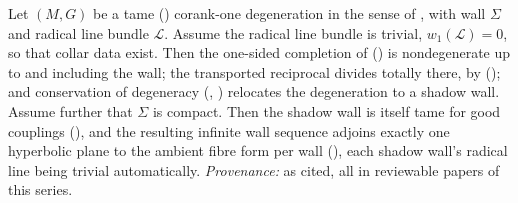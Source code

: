 Let $(M, G)$ be a tame () corank-one degeneration in the sense of \cite[Hyp.~2.1]{ButlerT4}, with wall $\Sigma$ and radical line bundle $\mathcal{L}$. Assume the radical line bundle is trivial, $w_1(\mathcal{L}) = 0$, so that collar data exist. Then the one-sided completion of \cite[Thm.~4.4]{ButlerT4} () is nondegenerate up to and including the wall; the transported reciprocal divides totally there, by \cite[Thm.~4.10]{ButlerT1} (); and conservation of degeneracy \cite[Thm.~5.1, Prop.~5.2]{ButlerT4} (, ) relocates the degeneration to a shadow wall. Assume further that $\Sigma$ is compact. Then the shadow wall is itself tame for good couplings \cite[Lem.~5.3]{ButlerT4} (), and the resulting infinite wall sequence adjoins exactly one hyperbolic plane to the ambient fibre form per wall \cite[Rem.~5.4, Cor.~5.5]{ButlerT4} (), each shadow wall's radical line being trivial automatically. \emph{Provenance:} as cited, all in reviewable papers of this series.
